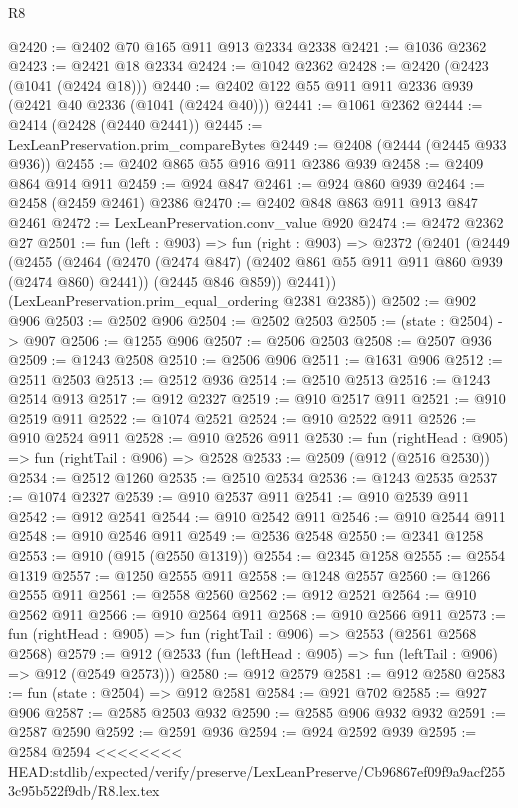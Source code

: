 \begin{lexlean}{R8}
\begin{coremodule}
{{{{{{{{{{{{{{{{{{{{{{{{{{{{{{{{{{{{{{{{{{{{{@2420 := @2402 @70 @165 @911 @913 @2334 @2338
@2421 := @1036 @2362
@2423 := @2421 @18 @2334
@2424 := @1042 @2362
@2428 := @2420 (@2423 (@1041 (@2424 @18)))
@2440 := @2402 @122 @55 @911 @911 @2336 @939 (@2421 @40 @2336 (@1041 (@2424 @40)))
@2441 := @1061 @2362
@2444 := @2414 (@2428 (@2440 @2441))
@2445 := LexLeanPreservation.prim_compareBytes
@2449 := @2408 (@2444 (@2445 @933 @936))
@2455 := @2402 @865 @55 @916 @911 @2386 @939
@2458 := @2409 @864 @914 @911
@2459 := @924 @847
@2461 := @924 @860 @939
@2464 := @2458 (@2459 @2461) @2386
@2470 := @2402 @848 @863 @911 @913 @847 @2461
@2472 := LexLeanPreservation.conv_value @920
@2474 := @2472 @2362 @27
@2501 := fun (left : @903) =>
  fun (right : @903) =>
  @2372
    (@2401
      (@2449
        (@2455
          (@2464
            (@2470 (@2474 @847) (@2402 @861 @55 @911 @911 @860 @939 (@2474 @860) @2441))
            (@2445 @846 @859))
          @2441))
      (LexLeanPreservation.prim_equal_ordering @2381 @2385))
@2502 := @902 @906
@2503 := @2502 @906
@2504 := @2502 @2503
@2505 := (state : @2504) -> @907
@2506 := @1255 @906
@2507 := @2506 @2503
@2508 := @2507 @936
@2509 := @1243 @2508
@2510 := @2506 @906
@2511 := @1631 @906
@2512 := @2511 @2503
@2513 := @2512 @936
@2514 := @2510 @2513
@2516 := @1243 @2514 @913
@2517 := @912 @2327
@2519 := @910 @2517 @911
@2521 := @910 @2519 @911
@2522 := @1074 @2521
@2524 := @910 @2522 @911
@2526 := @910 @2524 @911
@2528 := @910 @2526 @911
@2530 := fun (rightHead : @905) => fun (rightTail : @906) => @2528
@2533 := @2509 (@912 (@2516 @2530))
@2534 := @2512 @1260
@2535 := @2510 @2534
@2536 := @1243 @2535
@2537 := @1074 @2327
@2539 := @910 @2537 @911
@2541 := @910 @2539 @911
@2542 := @912 @2541
@2544 := @910 @2542 @911
@2546 := @910 @2544 @911
@2548 := @910 @2546 @911
@2549 := @2536 @2548
@2550 := @2341 @1258
@2553 := @910 (@915 (@2550 @1319))
@2554 := @2345 @1258
@2555 := @2554 @1319
@2557 := @1250 @2555 @911
@2558 := @1248 @2557
@2560 := @1266 @2555 @911
@2561 := @2558 @2560
@2562 := @912 @2521
@2564 := @910 @2562 @911
@2566 := @910 @2564 @911
@2568 := @910 @2566 @911
@2573 := fun (rightHead : @905) => fun (rightTail : @906) => @2553 (@2561 @2568 @2568)
@2579 := @912 (@2533 (fun (leftHead : @905) => fun (leftTail : @906) => @912 (@2549 @2573)))
@2580 := @912 @2579
@2581 := @912 @2580
@2583 := fun (state : @2504) => @912 @2581
@2584 := @921 @702
@2585 := @927 @906
@2587 := @2585 @2503 @932
@2590 := @2585 @906 @932 @932
@2591 := @2587 @2590
@2592 := @2591 @936
@2594 := @924 @2592 @939
@2595 := @2584 @2594
<<<<<<<< HEAD:stdlib/expected/verify/preserve/LexLeanPreserve/Cb96867ef09f9a9acf2553c95b522f9db/R8.lex.tex
}}}}}}}}}}}}}}}}}}}}}}}}}}}}}}}}}}}}}}}}}}}}}
\end{coremodule}
\end{lexlean}

